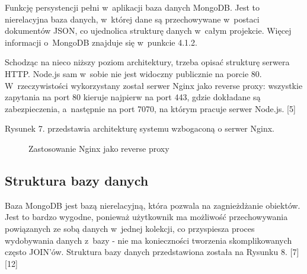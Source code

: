 \documentclass[8pt,a4paper,notitlepage]{article}
\begin{document}
\par Funkcję persystencji pełni w~aplikacji baza danych MongoDB. Jest to nierelacyjna baza danych, w~której dane są przechowywane w~postaci dokumentów JSON, co ujednolica strukturę danych w~całym projekcie. Więcej informacji o~MongoDB znajduje się w~punkcie 4.1.2.

\par Schodząc na nieco niższy poziom architektury, trzeba opisać strukturę serwera HTTP. Node.js sam w~sobie nie jest widoczny publicznie na porcie 80. W~rzeczywistości wykorzystany został serwer Nginx jako reverse proxy: wszystkie zapytania na port 80 kieruje najpierw na port 443, gdzie dokładane są zabezpieczenia, a~następnie na port 7070, na którym pracuje serwer Node.js. [5]
\par Rysunek 7. przedstawia architekturę systemu wzbogaconą o serwer Nginx.

\begin{figure}[H]
\begin{center}
\caption{Zastosowanie Nginx jako reverse proxy}
\end{center}
\end{figure}

\subsection{Struktura bazy danych}
Baza MongoDB jest bazą nierelacyjną, która pozwala na zagnieżdżanie obiektów. Jest to bardzo wygodne, ponieważ użytkownik ma możliwość przechowywania powiązanych ze sobą danych w~jednej kolekcji, co przyspiesza proces wydobywania danych z~bazy - nie ma konieczności tworzenia skomplikowanych często JOIN'ów. Struktura bazy danych przedstawiona została na Rysunku 8. [7] [12]
\end{document}
